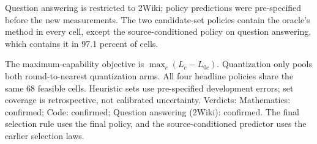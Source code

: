 \begin{table}[tb]
\begin{tabular*}{\textwidth}
\bottomrule
\end{tabular*}
\par\smallskip\begin{minipage}{\linewidth}\footnotesize Question answering is restricted to 2Wiki; policy predictions were pre-specified before the new measurements. The two candidate-set policies contain the oracle's method in every cell, except the source-conditioned policy on question answering, which contains it in 97.1 percent of cells.\end{minipage}
\par\smallskip\begin{minipage}{\linewidth}\footnotesize
The maximum-capability objective is $\max_c(L_c-L_{0c})$. Quantization only pools both round-to-nearest quantization arms. All four headline policies share the same 68 feasible cells. Heuristic sets use pre-specified development errors; set coverage is retrospective, not calibrated uncertainty. Verdicts: Mathematics: confirmed; Code: confirmed; Question answering (2Wiki): confirmed. The final selection rule uses the final policy, and the source-conditioned predictor uses the earlier selection laws.
\end{minipage}
\end{table}
